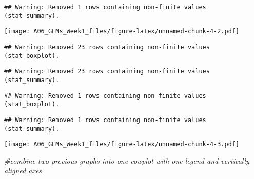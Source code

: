 \documentclass[
]{article}
\newenvironment{Shaded}{\begin{snugshade}}{\end{snugshade}}
\newcommand{\CommentTok}[1]{\textcolor[rgb]{0.56,0.35,0.01}{\textit{#1}}}
\newcommand{\DataTypeTok}[1]{\textcolor[rgb]{0.13,0.29,0.53}{#1}}
\newcommand{\DecValTok}[1]{\textcolor[rgb]{0.00,0.00,0.81}{#1}}
\newcommand{\FloatTok}[1]{\textcolor[rgb]{0.00,0.00,0.81}{#1}}
\newcommand{\KeywordTok}[1]{\textcolor[rgb]{0.13,0.29,0.53}{\textbf{#1}}}
\newcommand{\NormalTok}[1]{#1}
\newcommand{\OperatorTok}[1]{\textcolor[rgb]{0.81,0.36,0.00}{\textbf{#1}}}
\newcommand{\StringTok}[1]{\textcolor[rgb]{0.31,0.60,0.02}{#1}}
\begin{document}
\begin{verbatim}
## Warning: Removed 1 rows containing non-finite values (stat_summary).
\end{verbatim}

\texttt{[image: A06\_GLMs\_Week1\_files/figure-latex/unnamed-chunk-4-2.pdf]}

\begin{Shaded}
\end{Shaded}

\begin{verbatim}
## Warning: Removed 23 rows containing non-finite values (stat_boxplot).
\end{verbatim}

\begin{verbatim}
## Warning: Removed 23 rows containing non-finite values (stat_summary).
\end{verbatim}

\begin{verbatim}
## Warning: Removed 1 rows containing non-finite values (stat_boxplot).
\end{verbatim}

\begin{verbatim}
## Warning: Removed 1 rows containing non-finite values (stat_summary).
\end{verbatim}

\texttt{[image: A06\_GLMs\_Week1\_files/figure-latex/unnamed-chunk-4-3.pdf]}

\begin{Shaded}
\begin{Highlighting}[]
\CommentTok{#combine two previous graphs into one cowplot with one legend and vertically aligned axes}
\end{Highlighting}
\end{Shaded}
\end{document}
